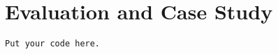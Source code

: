 \chapter{Evaluation and Case Study}\label{ch:evaluation}

\begin{lstlisting}
Put your code here.
\end{lstlisting}